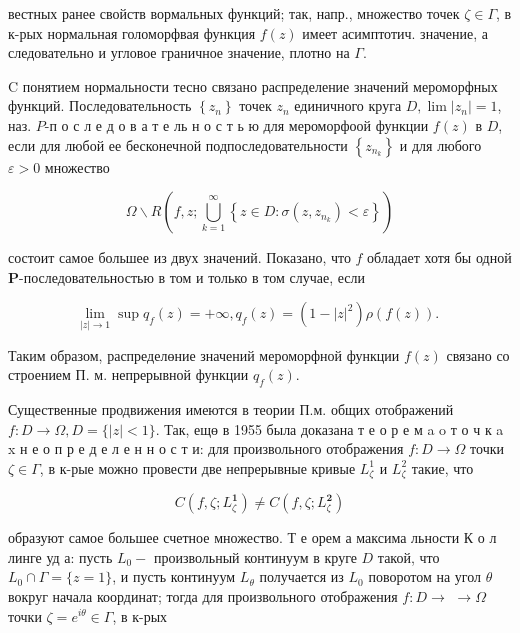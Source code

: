 \documentclass[10pt]{article}
\begin{document}
вестных ранее свойств вормальных функций; так, напр., множество точек $\zeta \in \Gamma$, в к-рых нормальная голоморфвая функция $f(z)$ имеет асимптотич. значение, а следовательно и угловое граничное значение, плотно на $\Gamma$.



C понятием нормальности тесно связано распределение значений мероморфных функций. Последовательность $\left\{z_{n}\right\}$ точек $z_{n}$ единичного круга $D, \lim \left|z_{n}\right|=1$, наз. $P$-п о с л е д о в а т е ль н о с т ь ю для мероморфоой функции $f(z)$ в $D$, если для любой ее бесконечной подпоследовательности $\left\{z_{n_{k}}\right\}$ и для любого $\varepsilon>0$ множество



\[

\Omega \backslash R\left(f, z ; \bigcup_{k=1}^{\infty}\left\{z \in D: \sigma\left(z, z_{n_{k}}\right)<\varepsilon\right\}\right)

\]



состоит самое большее из двух значений. Показано, что $f$ обладает хотя бы одной $\boldsymbol{P}$-последовательностью в том и только в том случае, если



\[

\lim _{|z| \rightarrow 1} \sup q_{f}(z)=+\infty, q_{f}(z)=\left(1-|z|^{2}\right) \rho(f(z)) \text {. }

\]



Таким образом, распределөние значений мероморфной функции $f(z)$ связано со строением П. м. непрерывной функции $q_{f}(z)$.



Существенные продвижения имеются в теории П.м. общих отображений $f: D \rightarrow \Omega, D=\{|z|<1\}$. Так, ещө в 1955 была доказана т е о р е м a o т о ч к a x н е о п р е д е л е н н о с т и: для произвольного отображения $f: D \rightarrow \Omega$ точки $\zeta \in \Gamma$, в к-рые можно провести две непрерывные кривые $L_{\zeta}^{1}$ и $L_{\zeta}^{2}$ такие, что



\[

C\left(f, \zeta ; L_{\zeta}^{\mathbf{1}}\right) \neq C\left(f, \zeta ; L_{\zeta}^{\mathbf{2}}\right)

\]



образуют самое большее счетное множество. Т е орем а максима льности К о л линге уд а: пусть $L_{0}-$ произвольный континуум в круге $D$ такой, что $L_{0} \cap \Gamma=\{z=1\}$, и пусть континуум $L_{\theta}$ получается из $L_{0}$ поворотом на угол $\theta$ вокруг начала координат; тогда для произвольного отображения $f: D \rightarrow$ $\rightarrow \Omega$ точки $\zeta=e^{i \theta} \in \Gamma$, в к-рых
\end{document}
